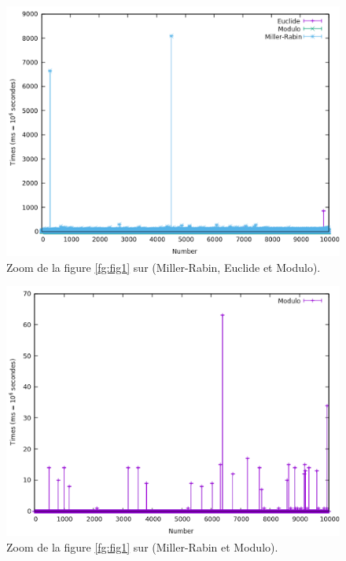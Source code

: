 \begin{figure}[!ht]
		\begin{center}\includegraphics[scale=0.6]{RZoom2.png}\end{center}
		\caption{Zoom de la figure \ref{fg:fig1} sur (Miller-Rabin, Euclide et Modulo).}
		\label{fg:fig7}
\end{figure}
\begin{figure}[!ht]
		\begin{center}\includegraphics[scale=0.5]{RZoom4.png}\end{center}
		\caption{Zoom de la figure \ref{fg:fig1} sur (Miller-Rabin et Modulo).}
		\label{fg:fig8}
\end{figure}

